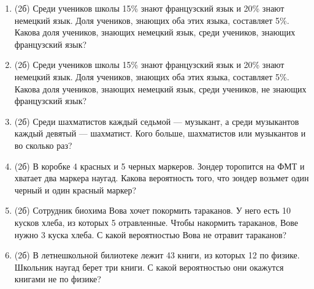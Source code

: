 \documentclass[a4paper, 12pt]{article}
\begin{document}
\begin{enumerate}
  \item (2б) Среди учеников школы 15\% знают французский язык и 20\% знают немецкий язык. Доля учеников, знающих оба этих языка, составляет 5\%. Какова доля учеников, знающих немецкий язык, среди учеников, знающих французский язык?
  \item (2б) Среди учеников школы 15\% знают французский язык и 20\% знают немецкий язык. Доля учеников, знающих оба этих языка, составляет 5\%. Какова доля учеников, знающих немецкий язык, среди учеников, не знающих французский язык?
  \item (2б) Среди шахматистов каждый седьмой — музыкант, а среди музыкантов каждый девятый — шахматист. Кого больше, шахматистов или музыкантов и во сколько раз?
  \item (2б) В коробке 4 красных и 5 черных маркеров.
  Зондер торопится на ФМТ и хватает два маркера наугад.
  Какова вероятность того, что зондер возьмет один черный и один красный маркер? 
  \item (2б) Сотрудник биохима Вова хочет покормить тараканов.
  У него есть 10 кусков хлеба, из которых 5 отравленные. Чтобы накормить тараканов,
  Вове нужно 3 куска хлеба. С какой вероятностью Вова не отравит тараканов?
  \item (2б) В летнешкольной билиотеке лежит 43 книги, из которых 12 по физике.
  Школьник наугад берет три книги. С какой вероятностью они окажутся книгами не по физике?
\end{enumerate}
\end{document}
